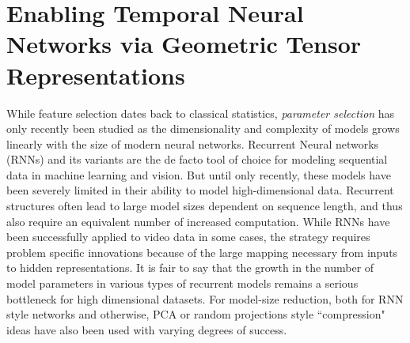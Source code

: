 \chapter{Enabling Temporal Neural Networks via Geometric Tensor Representations} \label{chap:ott} 

While feature selection dates back to classical statistics, 
\textit{parameter selection} has only recently been
studied as
the dimensionality and complexity of models grows
linearly with the size of modern neural networks.
Recurrent Neural networks (RNNs) and its variants are the de facto 
tool of choice 
for modeling sequential data in machine learning and vision.
But until only recently, these models have been severely limited in their ability to model high-dimensional data.
Recurrent structures often lead to large model sizes dependent on sequence length, and thus also require an equivalent number of increased computation.
While RNNs have been successfully applied to video data in some cases, the strategy 
requires problem specific innovations because of the large mapping necessary 
from inputs to hidden representations. It is fair to say that the growth 
in the number of model parameters in various types of 
recurrent models remains a serious bottleneck for high 
dimensional datasets. 
%
For model-size reduction, both for RNN style networks and otherwise, 
PCA or random projections \cite{ye2005two,bingham2001random} style ``compression" ideas have 
also been used with varying degrees of success.

